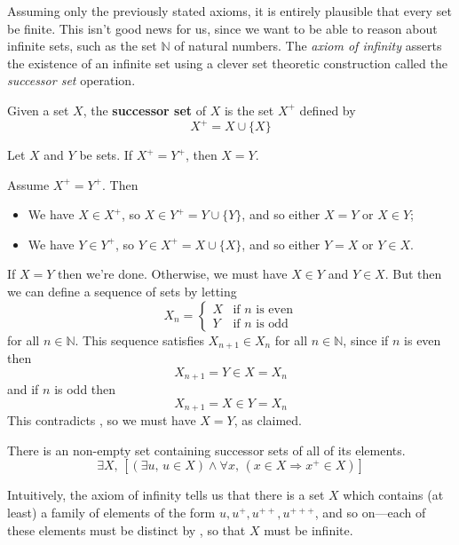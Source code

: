 Assuming only the previously stated axioms, it is entirely plausible that every set be finite. This isn't good news for us, since we want to be able to reason about infinite sets, such as the set $\mathbb{N}$ of natural numbers. The \textit{axiom of infinity} asserts the existence of an infinite set using a clever set theoretic construction called the \textit{successor set} operation.

\begin{definition}
\label{defSuccessorSet}
\label{successor set}
Given a set $X$, the \textbf{successor set} of $X$ is the set $X^+$ defined by
\[ X^+ = X \cup \{ X \} \]
\end{definition}

\begin{lemma}
\label{lemSuccessorSetIsInjective}
Let $X$ and $Y$ be sets. If $X^+ = Y^+$, then $X=Y$.
\end{lemma}

\begin{cproof}
Assume $X^+=Y^+$. Then
\begin{itemize}
\item We have $X \in X^+$, so $X \in Y^+ = Y \cup \{ Y \}$, and so either $X = Y$ or $X \in Y$;
\item We have $Y \in Y^+$, so $Y \in X^+ = X \cup \{ X \}$, and so either $Y = X$ or $Y \in X$.
\end{itemize}
If $X=Y$ then we're done. Otherwise, we must have $X \in Y$ and $Y \in X$. But then we can define a sequence of sets by letting
\[ X_n = \begin{cases} X & \text{if } n \text{ is even} \\ Y & \text{if } n \text{ is odd} \end{cases} \]
for all $n \in \mathbb{N}$. This sequence satisfies $X_{n+1} \in X_n$ for all $n \in \mathbb{N}$, since if $n$ is even then
\[ X_{n+1} = Y \in X = X_n \]
and if $n$ is odd then
\[ X_{n+1} = X \in Y = X_n \]
This contradicts , so we must have $X=Y$, as claimed.
\end{cproof}

\begin{axiom}
\label{axZFCInfinity}
There is an non-empty set containing successor sets of all of its elements.
\[ \exists X,\, [(\exists u,\, u \in X) \wedge \forall x,\, (x \in X \Rightarrow x^+ \in X)] \]
\end{axiom}

Intuitively, the axiom of infinity tells us that there is a set $X$ which contains (at least) a family of elements of the form $u, u^+, u^{++}, u^{+++}$, and so on---each of these elements must be distinct by , so that $X$ must be infinite.

